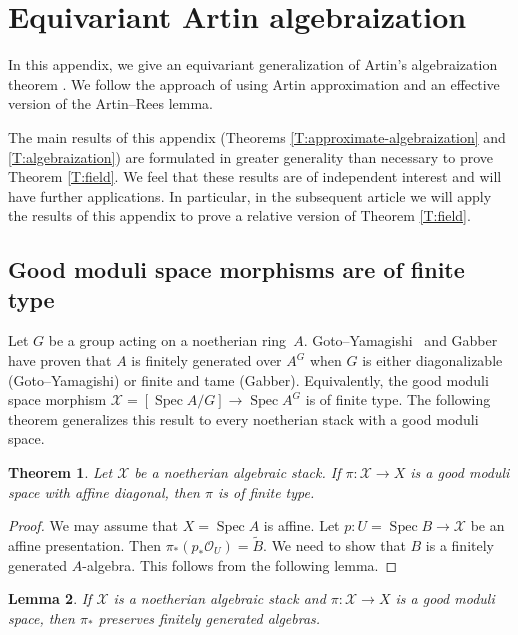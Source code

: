 \documentclass[a4paper]{amsart}
\theoremstyle{plain}
\newtheorem{theorem}{Theorem}[section]
\newtheorem{lemma}[theorem]{Lemma}
\theoremstyle{definition}
\theoremstyle{remark}
\numberwithin{equation}{section}
\newcommand{\stX}{\mathcal{X}} %
\newcommand\cX{\mathcal{X}}
\newcommand\oh{\mathcal{O}}
\newcommand\co{\colon}
\DeclareMathOperator{\Spec}{Spec}
\renewcommand{\tilde}{\widetilde}
\begin{document}
\appendix 

\section{Equivariant Artin algebraization} \label{A:algebraization} \label{A:approx} 

In this appendix, we give an equivariant generalization of Artin's algebraization theorem \cite[Thm.~1.6]{artin-algebraization}.  We follow the approach of \cite{conrad-dejong} using Artin approximation and an effective version of the Artin--Rees lemma.

The main results of this appendix (Theorems \ref{T:approximate-algebraization} and \ref{T:algebraization}) are formulated in greater generality than necessary to prove Theorem \ref{T:field}.  We feel that these results are of independent interest and will have further applications.  In particular, in the subsequent article \cite{ahr2} we will apply the results of this appendix to prove a relative version of Theorem \ref{T:field}.   

\subsection{Good moduli space morphisms are of finite type}
Let $G$ be a group acting on a noetherian ring~$A$.
Goto--Yamagishi~\cite{MR706507} and Gabber~\cite[Exp.~IV,
  Prop.~2.2.3]{MR3309086} have proven that $A$ is finitely generated over $A^G$
when $G$ is either diagonalizable (Goto--Yamagishi) or finite and tame
(Gabber). Equivalently, the good moduli space morphism $\stX=[\Spec A/G]\to
\Spec A^G$ is of finite type. The following theorem generalizes this result to
every noetherian stack with a good moduli space.

\begin{theorem} \label{T:good-finite-type}
Let $\cX$ be a noetherian algebraic stack. If $\pi \co \cX \to X$ is a good moduli space with affine diagonal, then $\pi$ is of finite type.
\end{theorem}

\begin{proof}
We may assume that $X = \Spec A$ is affine.  
Let $p \co U=\Spec B \to \cX$ be an affine presentation.  Then $\pi_* (p_* \oh_{U}) = \tilde{B}$.  We need to show that $B$ is a finitely generated $A$-algebra.  This follows from the following lemma. 
\end{proof}

\begin{lemma}
If $\cX$ is a noetherian algebraic stack and $\pi \co \cX \to X$ is a good moduli space, then $\pi_*$ preserves finitely generated algebras.
\end{lemma}
\end{document}

